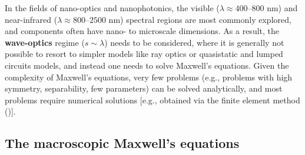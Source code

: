   In the fields of nano-optics and nanophotonics, the visible
  (\(\lambda \approx 400\)--\(800\) nm) and near-infrared (\(\lambda \approx 800\)--\(2500\)
  nm)
  spectral regions are most commonly explored, and components often have nano- to
  microscale dimensions. As a result, the \textbf{wave-optics} regime ($s
      \sim \lambda$) needs to be considered,
  where it is generally not possible to resort to simpler models like ray optics or
  quasistatic and lumped circuits models,
  and instead one needs to solve Maxwell's equations. Given the complexity of
  Maxwell's
  equations, very few problems (e.g., problems with high symmetry, separability,
  few parameters)
  can be solved analytically, and most problems require
  numerical solutions [e.g., obtained via the finite element method ()].

\subsection*{The macroscopic Maxwell's equations}

